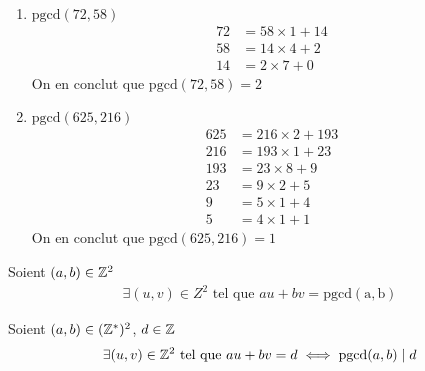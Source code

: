 \begin{exemple}~ 
\begin{enumerate}
\item $\mathrm{pgcd}(72, 58)$
\begin{align*}
72 &= 58 \times 1 + 14 \\
58 &= 14 \times 4 + 2 \\
14 &= 2 \times 7 + 0
\end{align*}
On en conclut que $\mathrm{pgcd}(72, 58) = 2$

\item $\mathrm{pgcd}(625, 216)$
\begin{align*}
625 &= 216 \times 2 + 193 \\
216 &= 193 \times 1 + 23 \\
193 &= 23 \times 8 + 9 \\
23 &= 9 \times 2 + 5 \\
9 &= 5 \times 1 + 4 \\
5 &= 4 \times 1 + 1
\end{align*}
On en conclut que $\mathrm{pgcd}(625, 216) = 1$
\end{enumerate}
\end{exemple}

\begin{graybox}
\begin{theoreme}
Soient $(a, b) \in \mathbb{Z}^2$ 
\begin{align*}
\exists (u, v) \in Z^2 \text{ tel que } au + bv = \mathrm{pgcd(a, b)}
\end{align*}
\end{theoreme}
\end{graybox}

\begin{graybox}
\begin{corollaire}
Soient $(a, b) \in (\mathbb{Z}^*)^2$, $d \in \mathbb{Z}$
\begin{align*}
\exists (u, v) \in \mathbb{Z}^2 \text{ tel que } au + bv = d \iff \mathrm{pgcd}(a,b) \mid d
\end{align*}
\end{corollaire}
\end{graybox}


